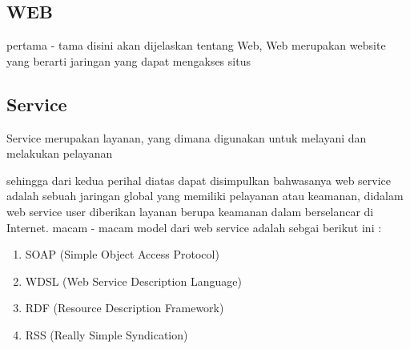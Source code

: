 \subsection{WEB}
pertama - tama disini akan dijelaskan tentang Web, Web merupakan website yang berarti jaringan yang dapat mengakses situs

\subsection{Service}
Service merupakan layanan, yang dimana digunakan untuk melayani dan melakukan pelayanan

sehingga dari kedua perihal diatas dapat disimpulkan bahwasanya web service adalah sebuah jaringan global yang memiliki pelayanan atau keamanan,
didalam web service user diberikan layanan berupa keamanan dalam berselancar di Internet. macam - macam model dari web service adalah sebgai berikut ini :

\begin{enumerate}
\item SOAP (Simple Object Access Protocol)
\item WDSL (Web Service Description Language)
\item RDF (Resource Description Framework)
\item RSS (Really Simple Syndication)
\end {enumerate}




		

